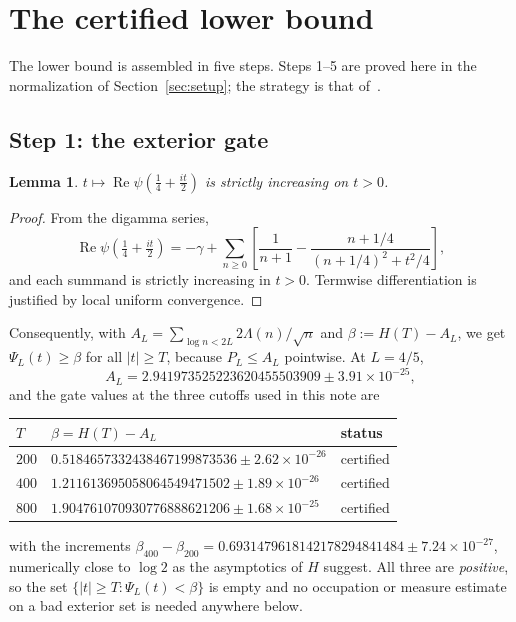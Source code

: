 \documentclass[11pt,a4paper]{article}
\newtheorem{lemma}[theorem]{Lemma}
\theoremstyle{definition}
\theoremstyle{remark}
\newcommand{\PsiL}{\Psi_{L}}
\begin{document}
\section{The certified lower bound}
\label{sec:lower}

The lower bound is assembled in five steps. Steps 1--5 are proved here in the
normalization of Section~\ref{sec:setup}; the strategy is that
of~\cite[Thm.~1.1]{Zhu}.

\subsection{Step 1: the exterior gate}

\begin{lemma}
\label{lem:gate}
$t \mapsto \operatorname{Re}\psi(\tfrac14 + \tfrac{it}{2})$ is strictly
increasing on $t > 0$.
\end{lemma}

\begin{proof}
From the digamma series,
\[
   \operatorname{Re}\psi\!\left(\tfrac14+\tfrac{it}{2}\right)
   = -\gamma + \sum_{n \ge 0}
     \left[\frac{1}{n+1} - \frac{n + 1/4}{(n+1/4)^2 + t^2/4}\right],
\]
and each summand is strictly increasing in $t > 0$. Termwise differentiation is
justified by local uniform convergence.
\end{proof}

Consequently, with $A_L = \sum_{\log n < 2L} 2\Lambda(n)/\sqrt n$ and
$\beta := H(T) - A_L$, we get $\PsiL(t) \ge \beta$ for all $|t| \ge T$, because
$P_L \le A_L$ pointwise. At $L = 4/5$,
\[
   A_L = 2.941973525223620455503909 \pm 3.91\times10^{-25},
\]
and the gate values at the three cutoffs used in this note are
\begin{center}
\begin{tabular}{lll}
\toprule
$T$ & $\beta = H(T) - A_L$ & status \\
\midrule
$200$ & $0.5184657332438467199873536 \pm 2.62\times10^{-26}$ & certified \\
$400$ & $1.211613695058064549471502 \pm 1.89\times10^{-26}$ & certified \\
$800$ & $1.904761070930776888621206 \pm 1.68\times10^{-25}$ & certified \\
\bottomrule
\end{tabular}
\end{center}
with the increments $\beta_{400} - \beta_{200} = 0.6931479618142178294841484 \pm
7.24\times10^{-27}$, numerically close to $\log 2$ as the asymptotics of $H$
suggest. All three are \emph{positive}, so the set
$\{|t| \ge T : \PsiL(t) < \beta\}$ is empty and no occupation or measure
estimate on a bad exterior set is needed anywhere below.
\end{document}
